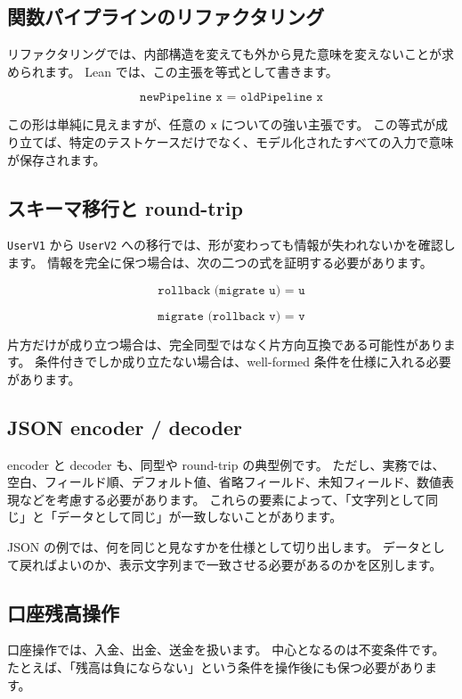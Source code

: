 \subsection{関数パイプラインのリファクタリング}

リファクタリングでは、内部構造を変えても外から見た意味を変えないことが求められます。
Lean では、この主張を等式として書きます。

\[
  \texttt{newPipeline x = oldPipeline x}
\]

この形は単純に見えますが、任意の \texttt{x} についての強い主張です。
この等式が成り立てば、特定のテストケースだけでなく、モデル化されたすべての入力で意味が保存されます。

\subsection{スキーマ移行と round-trip}

\texttt{UserV1} から \texttt{UserV2} への移行では、形が変わっても情報が失われないかを確認します。
情報を完全に保つ場合は、次の二つの式を証明する必要があります。

\[
  \texttt{rollback (migrate u) = u}
\]

\[
  \texttt{migrate (rollback v) = v}
\]

片方だけが成り立つ場合は、完全同型ではなく片方向互換である可能性があります。
条件付きでしか成り立たない場合は、well-formed 条件を仕様に入れる必要があります。

\subsection{JSON encoder / decoder}

encoder と decoder も、同型や round-trip の典型例です。
ただし、実務では、空白、フィールド順、デフォルト値、省略フィールド、未知フィールド、数値表現などを考慮する必要があります。
これらの要素によって、「文字列として同じ」と「データとして同じ」が一致しないことがあります。

JSON の例では、何を同じと見なすかを仕様として切り出します。
データとして戻ればよいのか、表示文字列まで一致させる必要があるのかを区別します。

\subsection{口座残高操作}

口座操作では、入金、出金、送金を扱います。
中心となるのは不変条件です。
たとえば、「残高は負にならない」という条件を操作後にも保つ必要があります。

